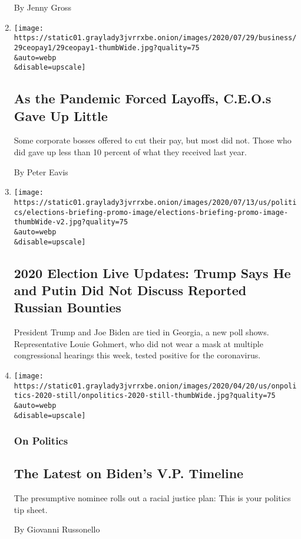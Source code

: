 \begin{enumerate}
  By Jenny Gross
\item
  \href{/2020/07/29/business/economy/ceo-pay-pandemic-layoffs.html}{}

  \texttt{[image: https://static01.graylady3jvrrxbe.onion/images/2020/07/29/business/29ceopay1/29ceopay1-thumbWide.jpg?quality=75\\\&auto=webp\\\&disable=upscale]}

  \hypertarget{as-the-pandemic-forced-layoffs-ceos-gave-up-little}{%
  \subsection{As the Pandemic Forced Layoffs, C.E.O.s Gave Up
  Little}\label{as-the-pandemic-forced-layoffs-ceos-gave-up-little}}

  Some corporate bosses offered to cut their pay, but most did not.
  Those who did gave up less than 10 percent of what they received last
  year.

  By Peter Eavis
\item
  \href{/2020/07/29/us/elections/biden-vs-trump.html}{}

  \texttt{[image: https://static01.graylady3jvrrxbe.onion/images/2020/07/13/us/politics/elections-briefing-promo-image/elections-briefing-promo-image-thumbWide-v2.jpg?quality=75\\\&auto=webp\\\&disable=upscale]}

  \hypertarget{2020-election-live-updates-trump-says-he-and-putin-did-not-discuss-reported-russian-bounties}{%
  \subsection{2020 Election Live Updates: Trump Says He and Putin Did
  Not Discuss Reported Russian
  Bounties}\label{2020-election-live-updates-trump-says-he-and-putin-did-not-discuss-reported-russian-bounties}}

  President Trump and Joe Biden are tied in Georgia, a new poll shows.
  Representative Louie Gohmert, who did not wear a mask at multiple
  congressional hearings this week, tested positive for the coronavirus.
\item
  \href{/2020/07/29/us/politics/biden-vp-announcement.html}{}

  \texttt{[image: https://static01.graylady3jvrrxbe.onion/images/2020/04/20/us/onpolitics-2020-still/onpolitics-2020-still-thumbWide.jpg?quality=75\\\&auto=webp\\\&disable=upscale]}

  \hypertarget{on-politics}{%
  \subsubsection{On Politics}\label{on-politics}}

  \hypertarget{the-latest-on-bidens-vp-timeline}{%
  \subsection{The Latest on Biden's V.P.
  Timeline}\label{the-latest-on-bidens-vp-timeline}}

  The presumptive nominee rolls out a racial justice plan: This is your
  politics tip sheet.

  By Giovanni Russonello
\end{enumerate}

